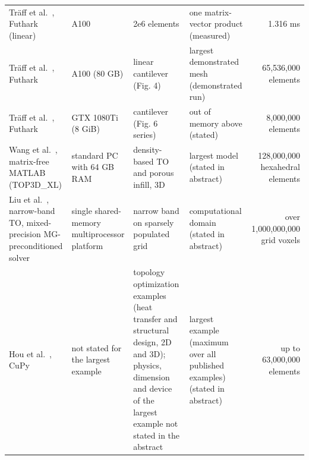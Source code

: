\begin{tabular}{p{4.2cm}p{3.6cm}p{6.4cm}p{3.2cm}r}
Tr\"aff et al.~\cite{traff2023simple}, Futhark (linear) & A100 & 2e6 elements & one matrix-vector product (measured) & 1.316 ms \\
Tr\"aff et al.~\cite{traff2023simple}, Futhark & A100 (80 GB) & linear cantilever (Fig. 4) & largest demonstrated mesh (demonstrated run) & 65{,}536{,}000 elements \\
Tr\"aff et al.~\cite{traff2023simple}, Futhark & GTX 1080Ti (8 GiB) & cantilever (Fig. 6 series) & out of memory above (stated) & 8{,}000{,}000 elements \\
Wang et al.~\cite{wang2025matrixfree}, matrix-free MATLAB (TOP3D\_XL) & standard PC with 64 GB RAM & density-based TO and porous infill, 3D & largest model (stated in abstract) & 128{,}000{,}000 hexahedral elements \\
Liu et al.~\cite{liu2018narrowband}, narrow-band TO, mixed-precision MG-preconditioned solver & single shared-memory multiprocessor platform & narrow band on sparsely populated grid & computational domain (stated in abstract) & over 1{,}000{,}000{,}000 grid voxels \\
Hou et al.~\cite{hou2025cupy}, CuPy & not stated for the largest example & topology optimization examples (heat transfer and structural design, 2D and 3D); physics, dimension and device of the largest example not stated in the abstract & largest example (maximum over all published examples) (stated in abstract) & up to 63{,}000{,}000 elements \\
\bottomrule
\end{tabular}
